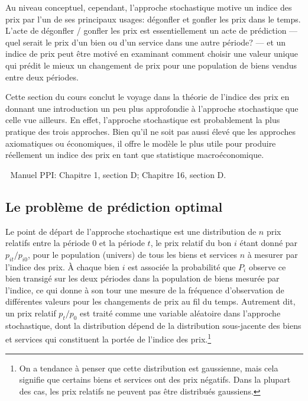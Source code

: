 \documentclass[
]{article}
\begin{document}
Au niveau conceptuel, cependant, l'approche stochastique motive un indice des prix par l'un de ses principaux usages: dégonfler et gonfler les prix dans le temps. L'acte de dégonfler / gonfler les prix est essentiellement un acte de prédiction --- quel serait le prix d'un bien ou d'un service dans une autre période? --- et un indice de prix peut être motivé en examinant comment choisir une valeur unique qui prédit le mieux un changement de prix pour une population de biens vendus entre deux périodes.

Cette section du cours conclut le voyage dans la théorie de l'indice des prix en donnant une introduction un peu plus approfondie à l'approche stochastique que celle vue ailleurs. En effet, l'approche stochastique est probablement la plus pratique des trois approches. Bien qu'il ne soit pas aussi élevé que les approches axiomatiques ou économiques, il offre le modèle le plus utile pour produire réellement un indice des prix en tant que statistique macroéconomique.

📖 Manuel PPI: Chapitre 1, section D; Chapitre 16, section D.

\hypertarget{le-probluxe8me-de-pruxe9diction-optimal}{%
\subsection{Le problème de prédiction optimal}\label{le-probluxe8me-de-pruxe9diction-optimal}}

Le point de départ de l'approche stochastique est une distribution de \(n\) prix relatifs entre la période 0 et la période \(t\), le prix relatif du bon \(i\) étant donné par \(p_{it} / p_{i0}\), pour le population (univers) de tous les biens et services \(n\) à mesurer par l'indice des prix. À chaque bien \(i\) est associée la probabilité que \(P_{i}\) observe ce bien transigé sur les deux périodes dans la population de biens mesurée par l'indice, ce qui donne à son tour une mesure de la fréquence d'observation de différentes valeurs pour les changements de prix au fil du temps. Autrement dit, un prix relatif \(p_{t} / p_{0}\) est traité comme une variable aléatoire dans l'approche stochastique, dont la distribution dépend de la distribution sous-jacente des biens et services qui constituent la portée de l'indice des prix.\footnote{On a tendance à penser que cette distribution est gaussienne, mais cela signifie que certains biens et services ont des prix négatifs. Dans la plupart des cas, les prix relatifs ne peuvent pas être distribués gaussiens.}
\end{document}
